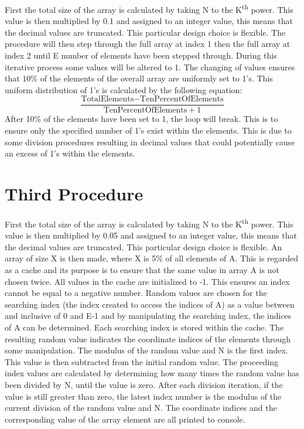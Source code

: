 \documentclass[conference]{IEEEtran}
\begin{document}
First the total size of the array is calculated by taking N to the K\textsuperscript{th} power. This value is then multiplied by 0.1 and assigned to an integer value, this means that the decimal values are truncated. This particular design choice is flexible. The procedure will then step through the full array at index 1 then the full array at index 2 until E number of elements have been stepped through. During this iterative process some values will be altered to 1. The changing of values ensures that 10\% of the elements of the overall array are uniformly set to 1's. This uniform distribution of 1's is calculated by the following equation:\\
\[\frac{\text{TotalElements} - \text{TenPercentOfElements}}{\text{TenPercentOfElements}+1}\]
After 10\% of the elements have been set to 1, the loop will break. This is to ensure only the specified number of 1's exist within the elements. This is due to some division procedures resulting in decimal values that could potentially cause an excess of 1's within the elements.\\


\section{Third Procedure}
First the total size of the array is calculated by taking N to the K\textsuperscript{th} power. This value is then multiplied by 0.05 and assigned to an integer value, this means that the decimal values are truncated. This particular design choice is flexible. An array of size X is then made, where X is 5\% of all elements of A. This is regarded as a cache and its purpose is to ensure that the same value in array A is not chosen twice. All values in the cache are initialized to -1. This ensures an index cannot be equal to a negative number. Random values are chosen for the searching index (the index created to access the indices of A) as a value between and inclusive of 0 and E-1 and by manipulating the searching index, the indices of A can be determined. Each searching index is stored within the cache. The resulting random value indicates the coordinate indices of the elements through some manipulation. The modulus of the random value and N is the first index. This value is then subtracted from the initial random value. The proceeding index values are calculated by determining how many times the random value has been divided by N, until the value is zero. After each division iteration, if the value is still greater than zero, the latest index number is the modulus of the current division of the random value and N. The coordinate indices and the corresponding value of the array element are all printed to console. \\
\end{document}
